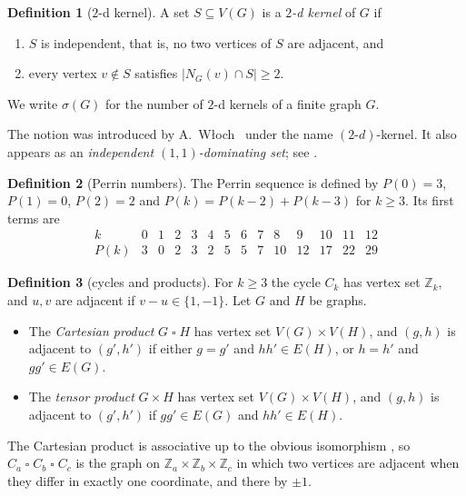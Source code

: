 \documentclass[11pt]{article}
\theoremstyle{plain}
\theoremstyle{definition}
\newtheorem{definition}[definition]{Definition}
\theoremstyle{remark}
\newcommand{\Z}{\mathbb{Z}}
\newcommand{\T}{\mathbin{\square}}
\newcommand{\Per}{P}
\begin{document}
\begin{definition}[$2$-d kernel]\label{def:2d}
A set $S \subseteq V(G)$ is a \emph{$2$-d kernel} of $G$ if
\begin{enumerate}[label=(K\arabic*)]
  \item\label{K1} $S$ is independent, that is, no two vertices of $S$ are adjacent, and
  \item\label{K2} every vertex $v \notin S$ satisfies $|N_G(v) \cap S| \ge 2$.
\end{enumerate}
We write $\sigma(G)$ for the number of $2$-d kernels of a finite graph $G$.
\end{definition}

The notion was introduced by A.~W{\l}och~\cite{Wloch2012} under the name
$(2\text{-}d)$-kernel. It also appears as an \emph{independent $(1,1)$-dominating set}; see
\cite{BMP2026}.

\begin{definition}[Perrin numbers]\label{def:perrin}
The Perrin sequence is defined by $\Per(0) = 3$, $\Per(1) = 0$, $\Per(2) = 2$ and
$\Per(k) = \Per(k-2) + \Per(k-3)$ for $k \ge 3$. Its first terms are
\[
\begin{array}{c|ccccccccccccc}
k & 0 & 1 & 2 & 3 & 4 & 5 & 6 & 7 & 8 & 9 & 10 & 11 & 12\\ \hline
\Per(k) & 3 & 0 & 2 & 3 & 2 & 5 & 5 & 7 & 10 & 12 & 17 & 22 & 29
\end{array}
\]
\end{definition}

\begin{definition}[cycles and products]\label{def:products}
For $k \ge 3$ the cycle $C_k$ has vertex set $\Z_k$, and $u, v$ are adjacent if
$v - u \in \{1, -1\}$. Let $G$ and $H$ be graphs.
\begin{itemize}
  \item The \emph{Cartesian product} $G \T H$ has vertex set $V(G) \times V(H)$, and $(g,h)$
        is adjacent to $(g',h')$ if either $g = g'$ and $hh' \in E(H)$, or $h = h'$ and
        $gg' \in E(G)$.
  \item The \emph{tensor product} $G \times H$ has vertex set $V(G) \times V(H)$, and $(g,h)$
        is adjacent to $(g',h')$ if $gg' \in E(G)$ and $hh' \in E(H)$.
\end{itemize}
The Cartesian product is associative up to the obvious isomorphism
\cite{HIK2011}, so $C_a \T C_b \T C_c$ is the graph on $\Z_a \times \Z_b \times
\Z_c$ in which two vertices are adjacent when they differ in exactly one coordinate, and
there by $\pm 1$.
\end{definition}
\end{document}
